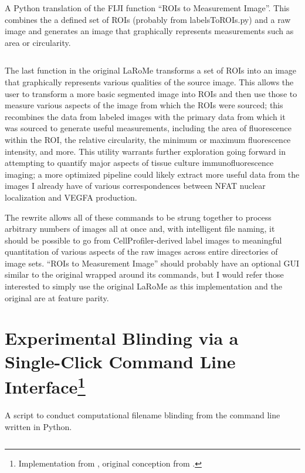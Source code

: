 \begin{code}
\caption{A Python translation of the FIJI function ``ROIs to Measurement Image''. This combines the a defined set of ROIs (probably from labelsToROIs.py) and a raw image and generates an image that graphically represents measurements such as area or circularity.}
\label{r2m}

\inputminted[breaklines,frame=single,fontsize=\small]{python}{source/ROIsToMap.py}

\end{code}

The last function in the original LaRoMe transforms a set of ROIs into an image that graphically represents various qualities of the source image. This allows the user to transform a more basic segmented image into ROIs and then use those to measure various aspects of the image from which the ROIs were sourced; this recombines the data from labeled images with the primary data from which it was sourced to generate useful measurements, including the area of fluorescence within the ROI, the relative circularity, the minimum or maximum fluorescence intensity, and more. This utility warrants further exploration going forward in attempting to quantify major aspects of tissue culture immunofluorescence imaging; a more optimized pipeline could likely extract more useful data from the images I already have of various correspondences between NFAT nuclear localization and VEGFA production.

The rewrite allows all of these commands to be strung together to process arbitrary numbers of images all at once and, with intelligent file naming, it should be possible to go from CellProfiler-derived label images to meaningful quantitation of various aspects of the raw images across entire directories of image sets. ``ROIs to Measurement Image'' should probably have an optional GUI similar to the original wrapped around its commands, but I would refer those interested to simply use the original LaRoMe as this implementation and the original are at feature parity.

\section[Experimental Blinding via a Single-Click Command Line Interface]{Experimental Blinding via a Single-Click Command Line Interface\footnote{Implementation from \citet{Brewer2022}, original conception from \citet{Salter2016}.}}\label{blinders}

\begin{code}
\caption{A script to conduct computational filename blinding from the command line written in Python.}
\label{blinder}

\inputminted[breaklines,frame=single,fontsize=\small]{python}{source/renamer.py}

\end{code}


